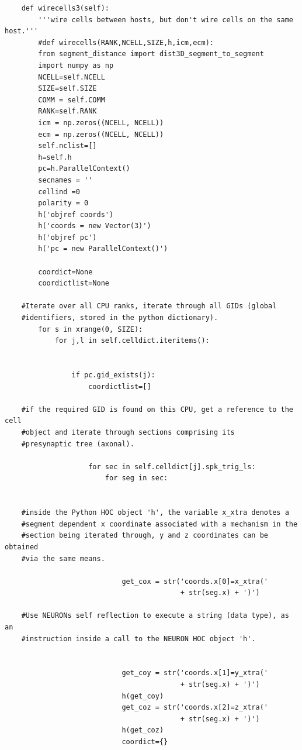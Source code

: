 \documentclass[a4paper,11pt]{article}
\begin{document}
\begin{verbatim}
    def wirecells3(self):        
        '''wire cells between hosts, but don't wire cells on the same host.'''
        #def wirecells(RANK,NCELL,SIZE,h,icm,ecm):
        from segment_distance import dist3D_segment_to_segment
        import numpy as np
        NCELL=self.NCELL
        SIZE=self.SIZE
        COMM = self.COMM
        RANK=self.RANK
        icm = np.zeros((NCELL, NCELL))
        ecm = np.zeros((NCELL, NCELL))
        self.nclist=[]
        h=self.h    
        pc=h.ParallelContext()
        secnames = ''
        cellind =0 
        polarity = 0
        h('objref coords')
        h('coords = new Vector(3)')
        h('objref pc')
        h('pc = new ParallelContext()')        
 
        coordict=None
        coordictlist=None
        
    #Iterate over all CPU ranks, iterate through all GIDs (global 
    #identifiers, stored in the python dictionary).
        for s in xrange(0, SIZE):
            for j,l in self.celldict.iteritems():
                    
                                    
                if pc.gid_exists(j):
                    coordictlist=[]         

    #if the required GID is found on this CPU, get a reference to the cell
    #object and iterate through sections comprising its 
    #presynaptic tree (axonal).
                    
                    for sec in self.celldict[j].spk_trig_ls:
                        for seg in sec:
                            
                            
    #inside the Python HOC object 'h', the variable x_xtra denotes a
    #segment dependent x coordinate associated with a mechanism in the
    #section being iterated through, y and z coordinates can be obtained
    #via the same means.         

                            get_cox = str('coords.x[0]=x_xtra('
                                          + str(seg.x) + ')')

    #Use NEURONs self reflection to execute a string (data type), as an
    #instruction inside a call to the NEURON HOC object 'h'.                

                            
                            get_coy = str('coords.x[1]=y_xtra('
                                          + str(seg.x) + ')')
                            h(get_coy)
                            get_coz = str('coords.x[2]=z_xtra('
                                          + str(seg.x) + ')')
                            h(get_coz)
                            coordict={}
                            

\end{verbatim}
\end{document}
